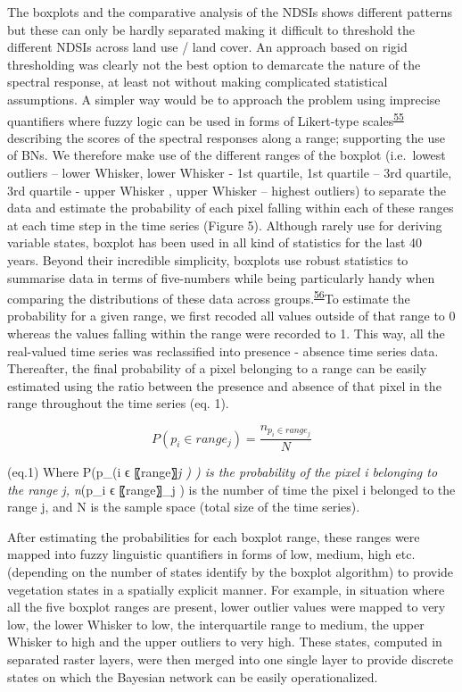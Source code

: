 \documentclass[12pt,oneside]{article}
\begin{document}
The boxplots and the comparative analysis of the NDSIs shows different patterns but these can only be hardly separated making it difficult to threshold the different NDSIs across land use / land cover. An approach based on rigid thresholding was clearly not the best option to demarcate the nature of the spectral response, at least not without making complicated statistical assumptions. A simpler way would be to approach the problem using imprecise quantifiers where fuzzy logic can be used in forms of Likert-type scales\textsuperscript{\protect\hyperlink{ref-Likert_1932}{55}} describing the scores of the spectral responses along a range; supporting the use of BNs. We therefore make use of the different ranges of the boxplot (i.e.~lowest outliers -- lower Whisker, lower Whisker - 1st quartile, 1st quartile -- 3rd quartile, 3rd quartile - upper Whisker , upper Whisker -- highest outliers) to separate the data and estimate the probability of each pixel falling within each of these ranges at each time step in the time series (Figure 5). Although rarely use for deriving variable states, boxplot has been used in all kind of statistics for the last 40 years. Beyond their incredible simplicity, boxplots use robust statistics to summarise data in terms of five-numbers while being particularly handy when comparing the distributions of these data across groups.\textsuperscript{\protect\hyperlink{ref-Wickham_and_Stryjewski_2012}{56}}To estimate the probability for a given range, we first recoded all values outside of that range to 0 whereas the values falling within the range were recorded to 1. This way, all the real-valued time series was reclassified into presence - absence time series data. Thereafter, the final probability of a pixel belonging to a range can be easily estimated using the ratio between the presence and absence of that pixel in the range throughout the time series (eq. 1).

\[P(p_i \in range_j) = \frac{n_{p_i \in range_j}}{N}\]

(eq.1)
Where P(p\_(i ϵ 〖range〗\emph{j ) ) is the probability of the pixel i belonging to the range j, n}(p\_i ϵ 〖range〗\_j ) is the number of time the pixel i belonged to the range j, and N is the sample space (total size of the time series).

After estimating the probabilities for each boxplot range, these ranges were mapped into fuzzy linguistic quantifiers in forms of low, medium, high etc. (depending on the number of states identify by the boxplot algorithm) to provide vegetation states in a spatially explicit manner. For example, in situation where all the five boxplot ranges are present, lower outlier values were mapped to very low, the lower Whisker to low, the interquartile range to medium, the upper Whisker to high and the upper outliers to very high. These states, computed in separated raster layers, were then merged into one single layer to provide discrete states on which the Bayesian network can be easily operationalized.
\end{document}
